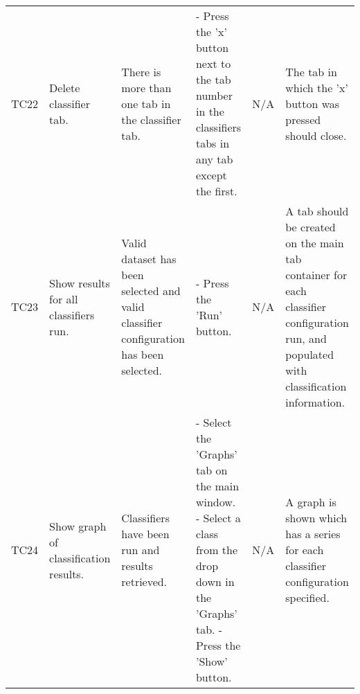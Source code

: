 \begin{scriptsize}
\begin{longtable}{@{}p{}p{}p{}p{}p{}p{}@{}}
TC22 & Delete classifier tab. & There is more than one tab in the classifier tab. & - Press the 'x' button next to the tab number in the classifiers tabs in any tab except the first. & N/A & The tab in which the 'x' button was pressed should close. \\ 
TC23 & Show results for all classifiers run. & Valid dataset has been selected and valid classifier configuration has been selected. & - Press the 'Run' button. & N/A & A tab should be created on the main tab container for each classifier configuration run, and populated with classification information. \\ 
TC24 & Show graph of classification results. & Classifiers have been run and results retrieved. & - Select the 'Graphs' tab on the main window. \newline - Select a class from the drop down in the 'Graphs' tab. \newline - Press the 'Show' button. & N/A & A graph is shown which has a series for each classifier configuration specified. \\ 

 \bottomrule
\end{longtable}
\end{scriptsize}
